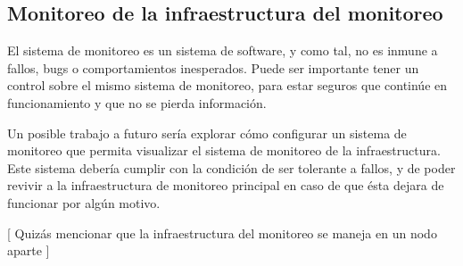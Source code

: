 \subsection{Monitoreo de la infraestructura del monitoreo}
\label{del-monitoreo}

El sistema de monitoreo es un sistema de software, y como tal, no es inmune a fallos, bugs o comportamientos inesperados. Puede ser importante tener un control sobre el mismo sistema de monitoreo, para estar seguros que continúe en funcionamiento y que no se pierda información.

Un posible trabajo a futuro sería explorar cómo configurar un sistema de monitoreo que permita visualizar el sistema de monitoreo de la infraestructura. Este sistema debería cumplir con la condición de ser tolerante a fallos, y de poder revivir a la infraestructura de monitoreo principal en caso de que ésta dejara de funcionar por algún motivo.

[ Quizás mencionar que la infraestructura del monitoreo se maneja en un nodo aparte ]
